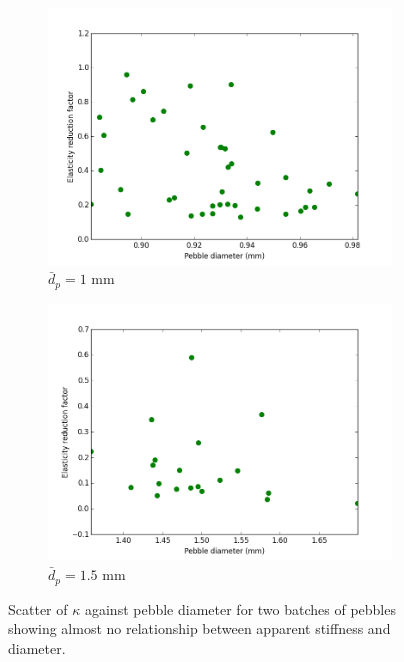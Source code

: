 \begin{figure}
        \centering
        \begin{subfigure}[b]{\imagewidth}
                \includegraphics[width=\textwidth]{chapters/figures/nfri-1mm-kappa-dp-scatter.png}
                \caption{$\bar{d}_p = 1$ mm}
                \label{fig:nfri-1mm-kappa-dp-scatter}
        \end{subfigure}

        \begin{subfigure}[b]{\imagewidth}
                \includegraphics[width=\textwidth]{chapters/figures/nfri-1.5mm-kappa-dp-scatter.png}
                \caption{$\bar{d}_p = 1.5$ mm}
                \label{fig:nfri-1.5mm-kappa-dp-scatter}
        \end{subfigure}
        \caption{Scatter of $\kappa$ against pebble diameter for two batches of \lit pebbles showing almost no relationship between apparent stiffness and diameter.}\label{fig:nfri-kappa-dp-scatter}
\end{figure}






